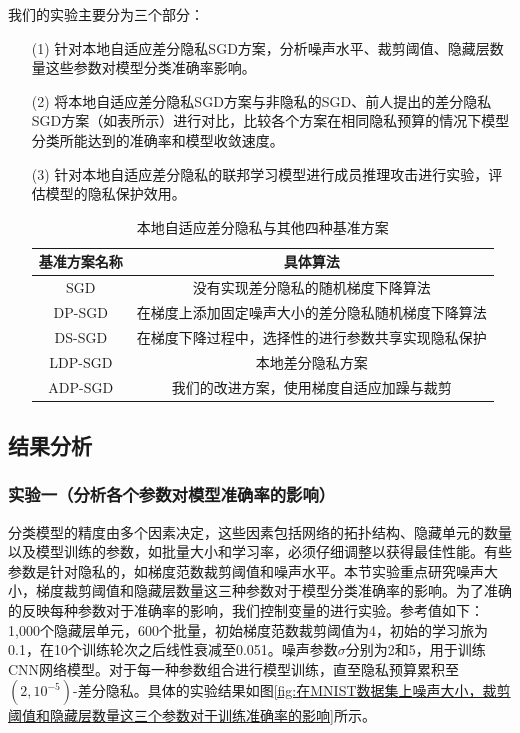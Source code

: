 我们的实验主要分为三个部分：
\begin{enumerate}
\item [(1)] 针对本地自适应差分隐私SGD方案，分析噪声水平、裁剪阈值、隐藏层数量这些参数对模型分类准确率影响。
\item [(2)] 将本地自适应差分隐私SGD方案与非隐私的SGD、前人提出的差分隐私SGD方案（如表所示）进行对比，比较各个方案在相同隐私预算的情况下模型分类所能达到的准确率和模型收敛速度。
\item [(3)] 针对本地自适应差分隐私的联邦学习模型进行成员推理攻击进行实验，评估模型的隐私保护效用。

\begin{table}[H]
	\centering
	\begin{tabular}{cc}
		\hline
		基准方案名称& 具体算法\\
		\hline
		SGD& 没有实现差分隐私的随机梯度下降算法\\
		DP-SGD\upcite{ref57}& 在梯度上添加固定噪声大小的差分隐私随机梯度下降算法\\
		DS-SGD\upcite{ref67}& 在梯度下降过程中，选择性的进行参数共享实现隐私保护\\
		LDP-SGD& 本地差分隐私方案\\
		ADP-SGD& 我们的改进方案，使用梯度自适应加躁与裁剪\\
		\hline
	\end{tabular}
	\caption{本地自适应差分隐私与其他四种基准方案}
	\label{tab1}
\end{table}

\end{enumerate}

\subsection{结果分析}

\subsubsection{实验一（分析各个参数对模型准确率的影响）} 
分类模型的精度由多个因素决定，这些因素包括网络的拓扑结构、隐藏单元的数量以及模型训练的参数，如批量大小和学习率，必须仔细调整以获得最佳性能。有些参数是针对隐私的，如梯度范数裁剪阈值和噪声水平。本节实验重点研究噪声大小，梯度裁剪阈值和隐藏层数量这三种参数对于模型分类准确率的影响。为了准确的反映每种参数对于准确率的影响，我们控制变量的进行实验。参考值如下：1,000个隐藏层单元，600个批量，初始梯度范数裁剪阈值为4，初始的学习旅为0.1，在10个训练轮次之后线性衰减至0.051。噪声参数$\sigma$分别为2和5，用于训练CNN网络模型。对于每一种参数组合进行模型训练，直至隐私预算累积至$\left(2,10^{-5}\right)$-差分隐私。具体的实验结果如图\ref{fig:在MNIST数据集上噪声大小，裁剪阈值和隐藏层数量这三个参数对于训练准确率的影响}所示。

